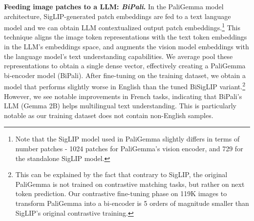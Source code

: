 \documentclass{article} %
\begin{document}

\noindent\textbf{Feeding image patches to a LLM: \textit{BiPali}.} In the PaliGemma model architecture, SigLIP-generated patch embeddings are fed to a text language model and we can obtain LLM contextualized output patch embeddings.\footnote{Note that the SigLIP model used in PaliGemma slightly differs in terms of number patches -  1024 patches for PaliGemma's vision encoder, and 729 for the standalone SigLIP model.} This technique aligns the image token representations with the text token embeddings in the LLM's embeddings space, and augments the vision model embeddings with the language model's text understanding capabilities. We average pool these representations to obtain a single dense vector, effectively creating a PaliGemma bi-encoder model (BiPali). After fine-tuning on the training dataset, we obtain a model that performs slightly worse in English than the tuned BiSigLIP variant.\footnote{This can be explained by the fact that contrary to SigLIP, the original PaliGemma is not trained on contrastive matching tasks, but rather on next token prediction. Our contrastive fine-tuning phase on 119K images to transform PaliGemma into a bi-encoder is 5 orders of magnitude smaller than SigLIP's original contrastive training.} However, we see notable improvements in French tasks, indicating that BiPali's LLM (Gemma 2B) helps multilingual text understanding. This is particularly notable as our training dataset does not contain non-English samples.
\end{document}
